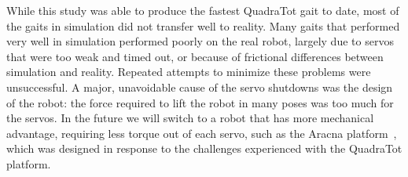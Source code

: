 While this study was able to produce the fastest QuadraTot gait to date, most of the gaits in simulation did not transfer well to reality. Many gaits that performed very well in simulation performed poorly on the real robot, largely due to servos that were too weak and timed out, or because of frictional differences between simulation and reality. Repeated attempts to minimize these problems were unsuccessful. 
A major, unavoidable cause of the servo shutdowns was the design of the robot: the force required to lift the robot in many poses was too much for the servos. In the future we will switch to a robot that has more mechanical advantage, requiring less torque out of each servo, such as the Aracna platform~\cite{lohmann2012aracna}, which was designed in response to the challenges experienced with the QuadraTot platform.  


%
%




